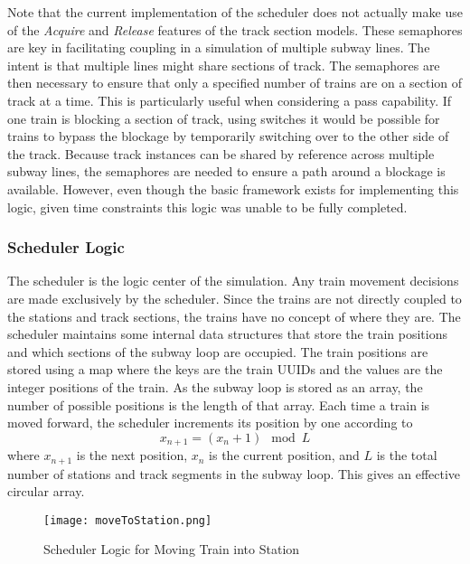 Note that the current implementation of the scheduler does not actually make use of the \textit{Acquire} and \textit{Release} features of the track section models. These semaphores are key in facilitating coupling in a simulation of multiple subway lines.  The intent is that multiple lines might share sections of track.  The semaphores are then necessary to ensure that only a specified number of trains are on a section of track at a time.  This is particularly useful when considering a pass capability.  If one train is blocking a section of track, using switches it would be possible for trains to bypass the blockage by temporarily switching over to the other side of the track. Because track instances can be shared by reference across multiple subway lines, the semaphores are needed to ensure a path around a blockage is available.  However, even though the basic framework exists for implementing this logic, given time constraints this logic was unable to be fully completed.
\subsubsection{Scheduler Logic}
The scheduler is the logic center of the simulation. Any train movement decisions are made exclusively by the scheduler. Since the trains are not directly coupled to the stations and track sections, the trains have no concept of where they are. The scheduler maintains some internal data structures that store the train positions and which sections of the subway loop are occupied.  The train positions are stored using a map where the keys are the train UUIDs and the values are the integer positions of the train.  As the subway loop is stored as an array, the number of possible positions is the length of that array.  Each time a train is moved forward, the scheduler increments its position by one according to
\begin{equation}
x_{n+1} = (x_n+1)\mod L
\end{equation}
where $x_{n+1}$ is the next position, $x_n$ is the current position, and $L$ is the total number of stations and track segments in the subway loop.  This gives an effective circular array.
%
\begin{figure}[htb]
	\centering
	\texttt{[image: moveToStation.png]}
	\caption{Scheduler Logic for Moving Train into Station}
	\label{fig:movetostation}
\end{figure}


